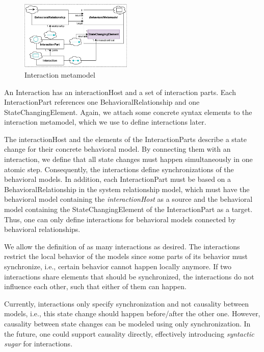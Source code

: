 \documentclass{jot}
\begin{document}
\begin{figure}[h]
    \centering
    \includegraphics[width=0.475\textwidth]{figures/interaction_metamodel.pdf}
    \caption{Interaction metamodel}
    \label{fig:interaction_metamodel}
\end{figure}

An \textsf{Interaction} has an \textsf{interactionHost} and a set of interaction \textsf{parts}.
Each \textsf{InteractionPart} references one \textsf{BehavioralRelationship} and one \textsf{StateChangingElement}.
Again, we attach some concrete syntax elements to the interaction metamodel, which we use to define interactions later.

The \textsf{interactionHost} and the elements of the \textsf{InteractionPart}s describe a state change for their concrete behavioral model.
By connecting them with an interaction, we define that all state changes must happen simultaneously in one atomic step.
Consequently, the interactions define synchronizations of the behavioral models.
In addition, each \textsf{InteractionPart} must be based on a \textsf{BehavioralRelationship} in the system relationship model, which must have the behavioral model containing the \textit{interactionHost} as a source and the behavioral model containing the \textsf{StateChangingElement} of the \textsf{InteractionPart} as a target.
Thus, one can only define interactions for behavioral models connected by behavioral relationships.

We allow the definition of as many interactions as desired.
The interactions restrict the local behavior of the models since some parts of its behavior must synchronize, i.e., certain behavior cannot happen locally anymore.
If two interactions share elements that should be synchronized, the interactions do not influence each other, such that either of them can happen.

Currently, interactions only specify synchronization and not causality between models, i.e., this state change should happen before/after the other one.
However, causality between state changes can be modeled using only synchronization.
In the future, one could support causality directly, effectively introducing \emph{syntactic sugar} for interactions.
\end{document}
